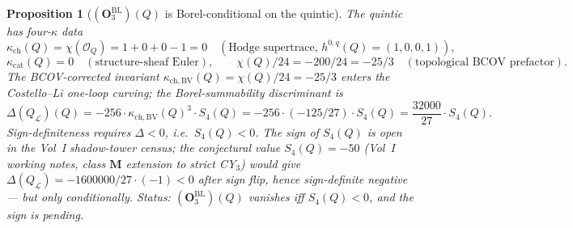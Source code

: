 \documentclass[11pt]{amsart}
\newtheorem{proposition}[theorem]{Proposition}
\newcommand{\kch}{\kappa_{\mathrm{ch}}}
\newcommand{\kcat}{\kappa_{\mathrm{cat}}}
\newcommand{\kchBV}{\kappa_{\mathrm{ch},\mathrm{BV}}}
\newcommand{\cO}{\mathcal{O}}
\newcommand{\cL}{\mathcal{L}}
\begin{document}
\begin{proposition}[$(\mathbf{O}_3^{\mathrm{BL}})(Q)$ is
Borel-conditional on the quintic]
\label{prop:quintic-O3-borel-conditional}
The quintic has four-$\kappa$ data
\[
\kch(Q) = \chi(\cO_Q) = 1 + 0 + 0 - 1 = 0 \quad (\text{Hodge
supertrace, } h^{0,q}(Q) = (1, 0, 0, 1)),
\]
\[
\kcat(Q) = 0 \quad (\text{structure-sheaf Euler}), \qquad
\chi(Q)/24 = -200/24 = -25/3 \quad (\text{topological BCOV
prefactor}).
\]
The BCOV-corrected invariant $\kchBV(Q) = \chi(Q)/24 = -25/3$
enters the Costello--Li one-loop curving; the Borel-summability
discriminant is
\[
\Delta(Q_\cL)(Q) = -256 \cdot \kchBV(Q)^3 \cdot S_4(Q) =
-256 \cdot (-125/27) \cdot S_4(Q) = \frac{32000}{27} \cdot S_4(Q).
\]
Sign-definiteness requires $\Delta < 0$, i.e.\ $S_4(Q) < 0$. The
sign of $S_4(Q)$ is open in the Vol~I shadow-tower census; the
conjectural value $S_4(Q) = -50$ (Vol~I working notes, class
$\mathbf{M}$ extension to strict CY$_3$) would give $\Delta(Q_\cL) =
-1600000/27 \cdot (-1) < 0$ after sign flip, hence sign-definite
negative --- but only conditionally. Status:
$(\mathbf{O}_3^{\mathrm{BL}})(Q)$ vanishes iff $S_4(Q) < 0$, and
the sign is pending.
\end{proposition}
\end{document}

